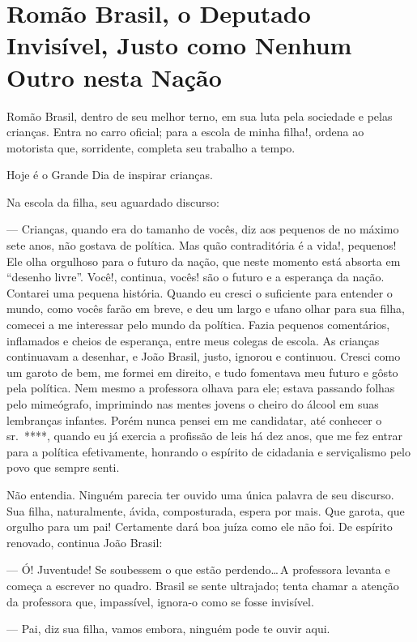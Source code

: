 \chapter[Romão Brasil, o Deputado Invisível]{Romão Brasil, o Deputado Invisível, Justo como Nenhum Outro nesta Nação}

Romão Brasil, dentro de seu melhor terno, em sua luta pela sociedade e pelas crianças. Entra no carro oficial; para a escola de minha filha!, ordena ao motorista que, sorridente, completa seu trabalho a tempo.

Hoje é o Grande Dia de inspirar crianças.

Na escola da filha, seu aguardado discurso:

--- Crianças, quando era do tamanho de vocês, diz aos pequenos de no máximo sete anos, não gostava de política. Mas quão contraditória é a vida!, pequenos! Ele olha orgulhoso para o futuro da nação, que neste momento está absorta em ``desenho livre''. Você!, continua, vocês! são o futuro e a esperança da nação. Contarei uma pequena história. Quando eu cresci o suficiente para entender o mundo, como vocês farão em breve, e deu um largo e ufano olhar para sua filha, comecei a me interessar pelo mundo da política. Fazia pequenos comentários, inflamados e cheios de esperança, entre meus colegas de escola. As crianças continuavam a desenhar, e João Brasil, justo, ignorou e continuou. Cresci como um garoto de bem, me formei em direito, e tudo fomentava meu futuro e gôsto pela política. Nem mesmo a professora olhava para ele; estava passando folhas pelo mimeógrafo, imprimindo nas mentes jovens o cheiro do álcool em suas lembranças infantes. Porém nunca pensei em me candidatar, até conhecer o sr.~****, quando eu já exercia a profissão de leis há dez anos, que me fez entrar para a política efetivamente, honrando o espírito de cidadania e serviçalismo pelo povo que sempre senti.

Não entendia. Ninguém parecia ter ouvido uma única palavra de seu discurso. Sua filha, naturalmente, ávida, composturada, espera por mais. Que garota, que orgulho para um pai! Certamente dará boa juíza como ele não foi. De espírito renovado, continua João Brasil:

--- Ó! Juventude! Se soubessem o que estão perdendo\ldots\,A professora levanta e começa a escrever no quadro. Brasil se sente ultrajado; tenta chamar a atenção da professora que, impassível, ignora-o como se fosse invisível.

--- Pai, diz sua filha, vamos embora, ninguém pode te ouvir aqui.


